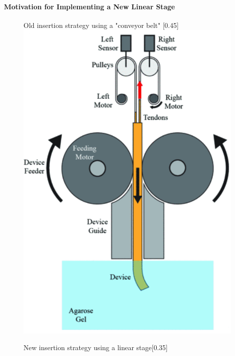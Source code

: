 \paragraph*{Motivation for Implementing a New Linear Stage}
\begin{figure}[H]
    \centering
    \begin{subcaptionbox}{Old insertion strategy using a "conveyor belt" \label{fig:conveyor}}[0.45\linewidth]
        {\includegraphics[width=\linewidth]{images/Hardware/oldInsertion.PNG}}
    \end{subcaptionbox}
    \hspace{0.05\linewidth}
    \begin{subcaptionbox}{New insertion strategy using a linear stage\label{fig:right}}[0.35\linewidth]

\end{subcaptionbox}
\end{figure}

